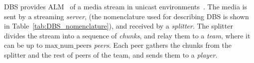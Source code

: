 DBS provides ALM~\cite{banerjee2002scalable} of a media stream in
unicast environments~\cite{comer2003computer}. The media is sent by a
streaming \emph{server}, (the nomenclature used for describing DBS is
shown in Table~\ref{tab:DBS_nomenclature}), and received by a
\emph{splitter}. The splitter divides the stream into a sequence of
\emph{chunks}, and relay them to a \emph{team}, where it can be up to
$\text{max\_num\_peers}$ \emph{peers}. Each peer gathers the chunks from
the splitter and the rest of peers of the team, and sends them to a
\emph{player}.
\begin{comment}
In single layered streams\footnote{Each layer of a
  scalable stream is received by a different peer attached to the same
  player capable or render scalable media.}, each peer is spawned by a
player (normal users should not run peers directly).
\end{comment}

\begin{comment}
/* quitar: We define the set of teams as
$\{T\}$,
and enumerate the peers in the team $T$ as $T=\{P_1,\cdots,P_{|T|}\}$. */
\end{comment}
